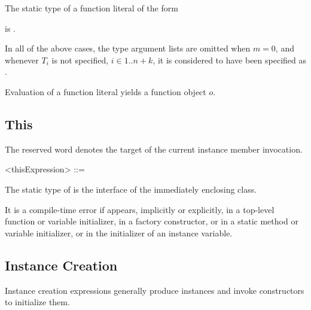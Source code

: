 \documentclass[makeidx]{article}
\begin{document}
{\LMHash{}%
The static type of a function literal of the form

\noindent
\code{<\TypeParametersStd>}

\noindent
{}

\noindent
is
.
\EndCase

\LMHash{}%
In all of the above cases,
the type argument lists are omitted when $m=0$,
and whenever $T_i$ is not specified, $i \in 1 .. n+k$,
it is considered to have been specified as \DYNAMIC{}.

\LMHash{}%
Evaluation of a function literal yields a function object $o$.



\subsection{This}

\LMHash{}%
The reserved word \THIS{} denotes the target of the current instance member invocation.

\begin{grammar}
<thisExpression> ::= \THIS{}
\end{grammar}

\LMHash{}%
The static type of \THIS{} is the interface of the immediately enclosing class.


\LMHash{}%
It is a compile-time error if \THIS{} appears, implicitly or explicitly, in a top-level function or variable initializer, in a factory constructor, or in a static method or variable initializer, or in the initializer of an instance variable.


\subsection{Instance Creation}

\LMHash{}%
Instance creation expressions generally produce instances
and invoke constructors to initialize them.

}
\end{document}
